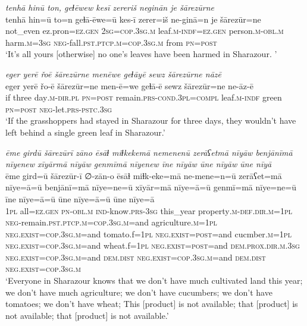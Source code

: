 \ea \label{PM.31}
\textit{tenhā hinū ton, geɫēwew kesī zereriš neginān je šārezūrne} \\ 
\gll tenhā hin=ū to=n geɫā-ēwe=ū kes-ī zerer=iš ne-ginā=n je šārezūr=ne \\ 
 not\_even ez.pron\textsc{\textsc{=ez.gen}} \textsc{2sg}\textsc{=cop}\textsc{.3sg}\textsc{.m} leaf\textsc{.m}\textsc{-indf}\textsc{\textsc{=ez.gen}} person\textsc{.m}\textsc{-obl}\textsc{.m} harm\textsc{.m}\textsc{=3sg} \textsc{neg-}fall\textsc{.pst}\textsc{.ptcp}\textsc{.m}\textsc{=cop}\textsc{.3sg}\textsc{.m} from \textsc{pn}\textsc{=\textsc{post}} \\ 
\glt `It’s all yours [otherwise] no one’s leaves have been harmed in Sharazour. '
\z 
 
\ea \label{PM.35}
\textit{eger yerē řoē šārezūrne menēwe geɫāyē sewz šārezūrne nāzē} \\ 
\gll eger yerē řo-ē šārezūr=ne men-ē=we geɫā-ē sewz šārezūr=ne ne-āz-ē \\ 
 if three day\textsc{.m}\textsc{-dir}\textsc{.pl} \textsc{pn}\textsc{=\textsc{post}} remain\textsc{.prs}\textsc{-cond}\textsc{.3pl}\textsc{=compl} leaf\textsc{.m}\textsc{-indf} green \textsc{pn}\textsc{=\textsc{post}} \textsc{neg-}let\textsc{.prs}\textsc{-pstc}\textsc{.3sg} \\ 
\glt `If the grasshoppers had stayed in Sharazour for three days, they wouldn’t have left behind a single green leaf in Sharazour.'
\z 
 
\ea \label{PM.37}
\textit{ēme girdū šārezūrī zāno ēsāɫ miɫkekemā nemenenū zerāʕetmā nīyāw benjānīmā nīyenew xīyārmā nīyāw genmīmā nīyenew īne nīyāw ūne nīyāw ūne nīyā} \\ 
\gll ēme gird=ū šārezūr-ī ∅-zān-o ēsāɫ miɫk-eke=mā ne-mene=n=ū zerāʕet=mā nīye=ā=ū benjānī=mā nīye=ne=ū xīyār=mā nīye=ā=ū genmī=mā nīye=ne=ū īne nīye=ā=ū ūne nīye=ā=ū ūne nīye=ā \\ 
 \textsc{1pl} all\textsc{\textsc{=ez.gen}} \textsc{pn}\textsc{-obl}\textsc{.m} \textsc{ind-}know\textsc{.prs}\textsc{-3sg} this\_year property\textsc{.m}\textsc{-def}\textsc{.dir}\textsc{.m}\textsc{=1pl} \textsc{neg-}remain\textsc{.pst}\textsc{.ptcp}\textsc{.m}\textsc{=cop}\textsc{.3sg}\textsc{.m}=and agriculture\textsc{.m}\textsc{=1pl} \textsc{\textsc{neg.}exist}\textsc{=cop}\textsc{.3sg}\textsc{.m}=and tomato.f\textsc{=1pl} \textsc{\textsc{neg.}exist}\textsc{=\textsc{post}}=and cucmber\textsc{.m}\textsc{=1pl} \textsc{\textsc{neg.}exist}\textsc{=cop}\textsc{.3sg}\textsc{.m}=and wheat.f\textsc{=1pl} \textsc{\textsc{neg.}exist}\textsc{=\textsc{post}}=and \textsc{dem.prox}\textsc{.dir}\textsc{.m}\textsc{.3sg} \textsc{\textsc{neg.}exist}\textsc{=cop}\textsc{.3sg}\textsc{.m}=and \textsc{dem.dist} \textsc{\textsc{neg.}exist}\textsc{=cop}\textsc{.3sg}\textsc{.m}=and \textsc{dem.dist} \textsc{\textsc{neg.}exist}\textsc{=cop}\textsc{.3sg}\textsc{.m} \\ 
\glt `Everyone in Sharazour knows that we don’t have much cultivated land this year; we don’t have much agriculture; we don’t have cucumbers; we don’t have tomatoes; we don’t have wheat; This [product] is not available; that [product] is not available; that [product] is not available.'
\z 
 
